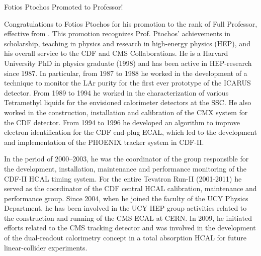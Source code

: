 \begin{headline}[enhanced, tikz={rotate=0}, width=0.48\textwidth]{Fotios Ptochos Promoted to Professor!}
\begin{multicols}{2}
    Congratulations to Fotios Ptochos for his promotion to the rank of
    Full Professor, effective from \MyDate. This promotion recognizes
    Prof. Ptochos' achievements in scholarship, teaching in physics
    and research in high-energy physics (HEP), and his overall service
    to the CDF and CMS Collaborations. He is a Harvard University PhD
    in physics graduate (1998) and has been active in HEP-research
    since 1987. In particular, from 1987 to 1988 he worked in the
    development of a technique to monitor the LAr purity for the first
    ever prototype of the ICARUS detector. From 1989 to 1994 he worked
    in the characterization of various Tetramethyl liquids for the
    envisioned calorimeter detectors at the SSC. He also
    worked in the construction, installation and calibration of the
    CMX system for the CDF detector. From 1994 to 1996 he developed an algorithm to improve
    electron identification for the CDF end-plug ECAL, which led to
    the development and implementation of the PHOENIX tracker system
    in CDF-II.

    In the period of 2000–2003, he was the coordinator of the group
    responsible for the development, installation, maintenance and
    performance monitoring of the CDF-II HCAL timing system. For the entire Tevatron Run-II
    (2001-2011) he served as the coordinator of the CDF central HCAL
    calibration, maintenance and performance group. Since
    2004, when he joined the faculty of the UCY Physics Department, he has
    been involved in the UCY HEP group activities related to the
    construction and running of the CMS ECAL at CERN. In 2009, he
    initiated efforts related to the CMS tracking detector and was
    involved in the development of the dual-readout calorimetry
    concept in a total absorption HCAL for future linear-collider experiments. 



\end{multicols}
\end{headline}
